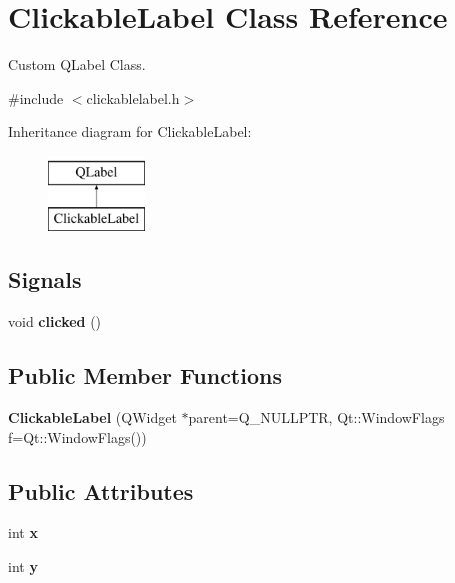 \hypertarget{class_clickable_label}{}\section{Clickable\+Label Class Reference}
\label{class_clickable_label}


Custom Q\+Label Class.  




{\ttfamily \#include $<$clickablelabel.\+h$>$}

Inheritance diagram for Clickable\+Label\+:\begin{figure}[H]
\begin{center}
\leavevmode
\includegraphics[height=2.000000cm]{class_clickable_label}
\end{center}
\end{figure}
\subsection*{Signals}
\begin{DoxyCompactItemize}
\item 
\mbox{\label{class_clickable_label_aba68cb811a595c6d90f5c994f2b31f4b}} 
void {\bfseries clicked} ()
\end{DoxyCompactItemize}
\subsection*{Public Member Functions}
\begin{DoxyCompactItemize}
\item 
\mbox{\label{class_clickable_label_ac2846619ea62f7fd6ac799d09302b786}} 
{\bfseries Clickable\+Label} (Q\+Widget $\ast$parent=Q\+\_\+\+N\+U\+L\+L\+P\+TR, Qt\+::\+Window\+Flags f=Qt\+::\+Window\+Flags())
\end{DoxyCompactItemize}
\subsection*{Public Attributes}
\begin{DoxyCompactItemize}
\item 
\mbox{\label{class_clickable_label_ac4efea912d411bc2ab98b4ea06cb076a}} 
int {\bfseries x}
\item 
\mbox{\label{class_clickable_label_ad59a3ac94dbad08ac2f60d70b063d130}} 
int {\bfseries y}
\end{DoxyCompactItemize}
